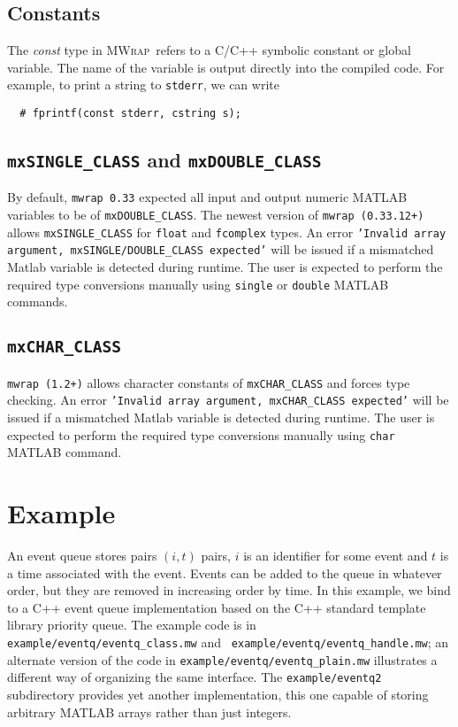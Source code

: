 \documentclass[12pt]{article}
\newcommand{\mwrap}{\textsc{MWrap}}
\begin{document}
\subsection{Constants}

The {\it const} type in \mwrap\ refers to a C/C++ symbolic constant or
global variable.  The name of the variable is output directly into the
compiled code.  For example, to print a string to {\tt stderr}, we can
write
\begin{verbatim}
  # fprintf(const stderr, cstring s);
\end{verbatim}


\subsection{{\tt mxSINGLE\_CLASS} and {\tt mxDOUBLE\_CLASS}}

By default, {\tt mwrap 0.33} expected all input and output numeric
MATLAB variables to be of {\tt mxDOUBLE\_CLASS}. The newest version of
{\tt mwrap (0.33.12+)} allows {\tt mxSINGLE\_CLASS} for {\tt float}
and {\tt fcomplex} types. An error {\tt 'Invalid array argument,
  mxSINGLE/DOUBLE\_CLASS expected'} will be issued if a mismatched
Matlab variable is detected during runtime. The user is expected to
perform the required type conversions manually using {\tt single} or
{\tt double} MATLAB commands.

\subsection{{\tt mxCHAR\_CLASS}}

{\tt mwrap (1.2+)} allows character constants of {\tt mxCHAR\_CLASS}
and forces type checking. An error {\tt 'Invalid array argument,
  mxCHAR\_CLASS expected'} will be issued if a mismatched Matlab
variable is detected during runtime. The user is expected to perform
the required type conversions manually using {\tt char} MATLAB
command.


\section{Example}

An event queue stores pairs $(i, t)$ pairs, $i$ is an identifier for
some event and $t$ is a time associated with the event.  Events can be
added to the queue in whatever order, but they are removed in
increasing order by time.  In this example, we bind to a C++ event
queue implementation based on the C++ standard template library
priority queue.  The example code is in {\tt
  example/eventq/eventq\_class.mw} and {\tt
  example/eventq/eventq\_handle.mw}; an alternate version of the code
in {\tt example/eventq/eventq\_plain.mw} illustrates a different way
of organizing the same interface.  The {\tt example/eventq2}
subdirectory provides yet another implementation, this one capable of
storing arbitrary MATLAB arrays rather than just integers.
\end{document}
